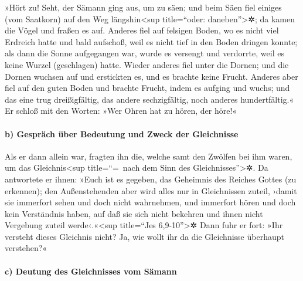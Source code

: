  »Hört zu! Seht, der Sämann ging aus, um zu säen;
 und beim Säen fiel einiges (vom Saatkorn) auf den Weg
längshin\textless sup title=``oder: daneben''\textgreater✲; da kamen die
Vögel und fraßen es auf.  Anderes fiel auf felsigen Boden,
wo es nicht viel Erdreich hatte und bald aufschoß, weil es nicht tief in
den Boden dringen konnte;  als dann die Sonne aufgegangen
war, wurde es versengt und verdorrte, weil es keine Wurzel (geschlagen)
hatte.  Wieder anderes fiel unter die Dornen; und die
Dornen wuchsen auf und erstickten es, und es brachte keine Frucht.
 Anderes aber fiel auf den guten Boden und brachte Frucht,
indem es aufging und wuchs; und das eine trug dreißigfältig, das andere
sechzigfältig, noch anderes hundertfältig.«  Er schloß mit
den Worten: »Wer Ohren hat zu hören, der höre!«

\hypertarget{b-gespruxe4ch-uxfcber-bedeutung-und-zweck-der-gleichnisse}{%
\paragraph{b) Gespräch über Bedeutung und Zweck der
Gleichnisse}\label{b-gespruxe4ch-uxfcber-bedeutung-und-zweck-der-gleichnisse}}

 Als er dann allein war, fragten ihn die, welche samt den
Zwölfen bei ihm waren, um das Gleichnis\textless sup title=``=~nach dem
Sinn des Gleichnisses''\textgreater✲.  Da antwortete er
ihnen: »Euch ist es gegeben, das Geheimnis des Reiches Gottes (zu
erkennen); den Außenstehenden aber wird alles nur in Gleichnissen
zuteil,  ›damit sie immerfort sehen und doch nicht
wahrnehmen, und immerfort hören und doch kein Verständnis haben, auf daß
sie sich nicht bekehren und ihnen nicht Vergebung zuteil
werde‹.«\textless sup title=``Jes 6,9-10''\textgreater✲ 
Dann fuhr er fort: »Ihr versteht dieses Gleichnis nicht? Ja, wie wollt
ihr da die Gleichnisse überhaupt verstehen?«

\hypertarget{c-deutung-des-gleichnisses-vom-suxe4mann}{%
\paragraph{c) Deutung des Gleichnisses vom
Sämann}\label{c-deutung-des-gleichnisses-vom-suxe4mann}}

